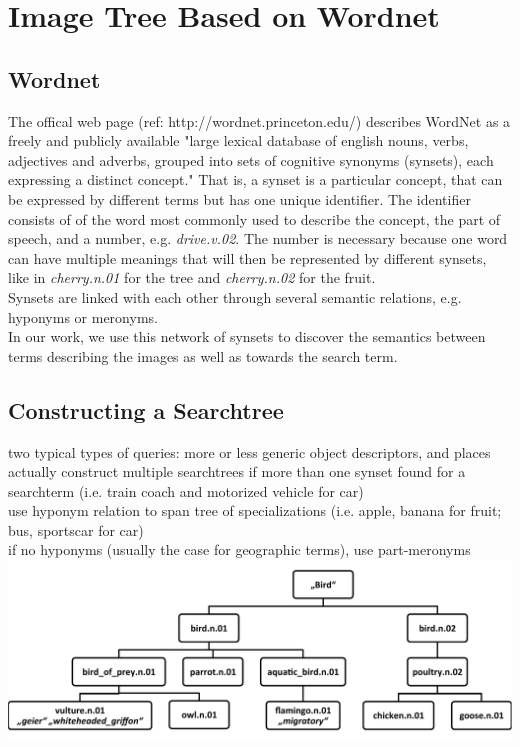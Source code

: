 %
\section{Image Tree Based on Wordnet}
\label{sec_wordnetsearchtree}

\subsection{Wordnet}
The offical web page (ref: http://wordnet.princeton.edu/) describes WordNet as a freely and publicly available "large lexical database of english nouns, verbs, adjectives and adverbs, grouped into sets of cognitive synonyms (synsets), each expressing a distinct concept." That is, a synset is a particular concept, that can be expressed by different terms but has one unique identifier. The identifier consists of of the word most commonly used to describe the concept, the part of speech, and a number, e.g. \emph{drive.v.02}.
The number is necessary because one word can have multiple meanings that will then be represented by different synsets, like in \emph{cherry.n.01} for the tree and \emph{cherry.n.02} for the fruit. \\

Synsets are linked with each other through several semantic relations, e.g. hyponyms or meronyms. \\
In our work, we use this network of synsets to discover the semantics between terms describing the images as well as towards the search term. \\
  

\subsection{Constructing a Searchtree}
two typical types of queries: more or less generic object descriptors, and places \\
actually construct multiple searchtrees if more than one synset found for a searchterm (i.e. train coach and motorized vehicle for car)\\
use hyponym relation to span tree of specializations (i.e. apple, banana for fruit; bus, sportscar for car)\\
if no hyponyms (usually the case for geographic terms), use part-meronyms\\
\includegraphics[width=\textwidth]{images/searchtree.pdf}

